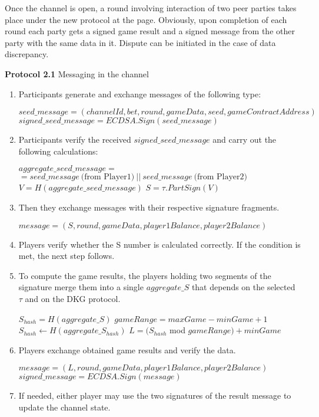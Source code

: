 Once the channel is open, a round involving interaction of two peer parties takes place under the new protocol at the  \pageref{intchannel1} page. Obviously, upon completion of each round each party gets a signed game result and a signed message from the other party with the same data in it. Dispute can be initiated in the case of data discrepancy.
\begin{algorithm} 
\caption*{\textbf{Protocol 2.1} Messaging in the channel}
\begin{enumerate}
	\item Participants generate and exchange messages of the following type:
 \label{intchannel1}
\begin{center}
$ seed\_message = (channelId, bet, round, gameData, seed, gameContractAddress)$
$signed\_seed\_message = ECDSA.Sign(seed\_message)$ 
\end{center}
	\item Participants verify the received $signed\_seed\_message$ and carry out the following calculations:
 \begin{algorithmic}
\State $aggregate\_seed\_message =$ \\ $= seed\_message \  \text{(from Player1)} \ ||  \ seed\_message \  \text{(from Player2)}$
\State $V = H(aggregate\_seed\_message)$
\State $S =  \tau .PartSign(V)$
 \end{algorithmic}
\item Then they exchange messages with their respective signature fragments.
\begin{center}
 $message = (S, round, gameData, player1Balance, player2Balance)$
\end{center}
	\item Players verify whether the S number is calculated correctly. If the condition is met, the next step follows.
	\item To compute the game results, the players holding two segments of the signature merge them into a single $aggregate\_S$ that depends on the selected  $\tau$ and on the DKG protocol.
\begin{algorithmic}
\State $S_{hash} = H(aggregate\_S)$
\State $gameRange = maxGame -  minGame + 1$
\State$ S_{hash}\gets H(aggregate\_S_{hash})$
\EndWhile
\State $L = (S_{hash}$ mod $gameRange) + minGame$
\end{algorithmic}
\end{enumerate}
\end{algorithm}
\begin{algorithm}
\begin{enumerate}
\setcounter{enumi}{5}
 \item Players exchange obtained game results and verify the data. 
\begin{center}
 $message = (L, round, gameData, player1Balance, player2Balance)$
 $signed\_message = ECDSA.Sign(message)$
\end{center}
\item If needed, either player may use the two signatures of the result message to update the channel state.
\end{enumerate}
\end{algorithm}

